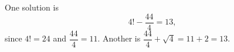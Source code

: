One solution is
\[
\boxed{4!-\dfrac{44}{4}=13},
\]
since $4!=24$ and $\dfrac{44}{4}=11$. Another is $\dfrac{44}{4}+\sqrt4=11+2=13$.
